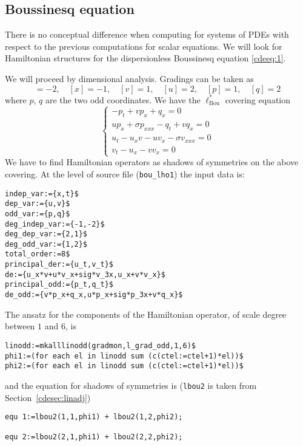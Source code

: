 \subsection{Boussinesq equation}
\label{cdesec:comp-syst-pdes}

There is no conceptual difference when computing for systems of PDEs with
respect to the previous computations for scalar equations. We will look for
Hamiltonian structures for the dispersionless Boussinesq equation \eqref{cdeeq:1}.

We will proceed by dimensional analysis. Gradings can be taken as
\begin{displaymath}
  [t]=-2,\quad [x]=-1,\quad [v]=1,\quad [u]=2,\quad [p]=1,\quad [q]=2
\end{displaymath}
where $p$, $q$ are the two odd coordinates. We have the
$\ell^*_{\text{Bou}}$ covering equation
\begin{displaymath}
  \label{eq:12}
  \left\{
  \begin{array}{l}
    -p_t+vp_x+q_x=0\\
    up_x+\sigma p_{xxx}-q_t+vq_x=0\\
  u_t-u_xv-uv_x-\sigma v_{xxx}=0\\
  v_t-u_x-vv_x=0
\end{array}
\right.
\end{displaymath}
We have to find Hamiltonian operators as shadows of symmetries on the above
covering.  At the level of source file (\texttt{bou\_lho1}) the input
data is:
\begin{verbatim}
indep_var:={x,t}$
dep_var:={u,v}$
odd_var:={p,q}$
deg_indep_var:={-1,-2}$
deg_dep_var:={2,1}$
deg_odd_var:={1,2}$
total_order:=8$
principal_der:={u_t,v_t}$
de:={u_x*v+u*v_x+sig*v_3x,u_x+v*v_x}$
principal_odd:={p_t,q_t}$
de_odd:={v*p_x+q_x,u*p_x+sig*p_3x+v*q_x}$
\end{verbatim}
The ansatz for the components of the Hamiltonian operator, of scale degree
between $1$ and $6$, is
\begin{verbatim}
linodd:=mkalllinodd(gradmon,l_grad_odd,1,6)$
phi1:=(for each el in linodd sum (c(ctel:=ctel+1)*el))$
phi2:=(for each el in linodd sum (c(ctel:=ctel+1)*el))$
\end{verbatim}
and the equation for shadows of symmetries is (\texttt{lbou2} is taken from
Section~\ref{cdesec:linadj})
\begin{verbatim}
equ 1:=lbou2(1,1,phi1) + lbou2(1,2,phi2);

equ 2:=lbou2(2,1,phi1) + lbou2(2,2,phi2);
\end{verbatim}
